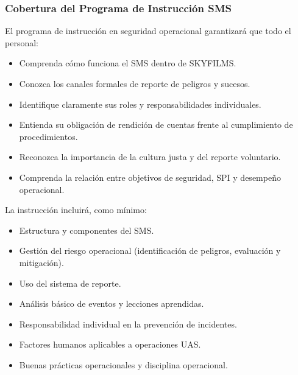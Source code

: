 \subsubsection{Cobertura del Programa de Instrucción SMS}

    El programa de instrucción en seguridad operacional garantizará que todo el personal:
        \begin{itemize}
            \item Comprenda cómo funciona el SMS dentro de SKYFILMS.

            \item Conozca los canales formales de reporte de peligros y sucesos.

            \item Identifique claramente sus roles y responsabilidades individuales.

            \item Entienda su obligación de rendición de cuentas frente al cumplimiento de procedimientos.

            \item Reconozca la importancia de la cultura justa y del reporte voluntario.

            \item Comprenda la relación entre objetivos de seguridad, SPI y desempeño operacional.
        \end{itemize}

    La instrucción incluirá, como mínimo:

        \begin{itemize}
            \item Estructura y componentes del SMS.

            \item Gestión del riesgo operacional (identificación de peligros, evaluación y mitigación).

            \item Uso del sistema de reporte.

            \item Análisis básico de eventos y lecciones aprendidas.

            \item Responsabilidad individual en la prevención de incidentes.

            \item Factores humanos aplicables a operaciones UAS.

            \item Buenas prácticas operacionales y disciplina operacional.
        \end{itemize}

